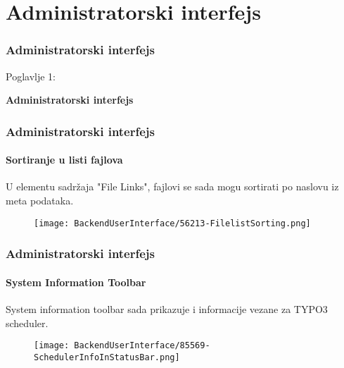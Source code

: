 %

\section{Administratorski interfejs}
\begin{frame}[fragile]
	\frametitle{Administratorski interfejs}

	\begin{center}\huge{Poglavlje 1:}\end{center}
	\begin{center}\huge{\color{typo3darkgrey}\textbf{Administratorski interfejs}}\end{center}

\end{frame}


\begin{frame}[fragile]
	\frametitle{Administratorski interfejs}
	\framesubtitle{Sortiranje u listi fajlova}

	U elementu sadržaja "File Links", fajlovi se sada mogu sortirati po naslovu iz meta podataka.

	\begin{figure}
		\texttt{[image: BackendUserInterface/56213-FilelistSorting.png]}
	\end{figure}

\end{frame}


\begin{frame}[fragile]
	\frametitle{Administratorski interfejs}
	\framesubtitle{System Information Toolbar}

	System information toolbar sada prikazuje i informacije vezane za TYPO3 scheduler.

	\begin{figure}
		\texttt{[image: BackendUserInterface/85569-SchedulerInfoInStatusBar.png]}
	\end{figure}

\end{frame}

